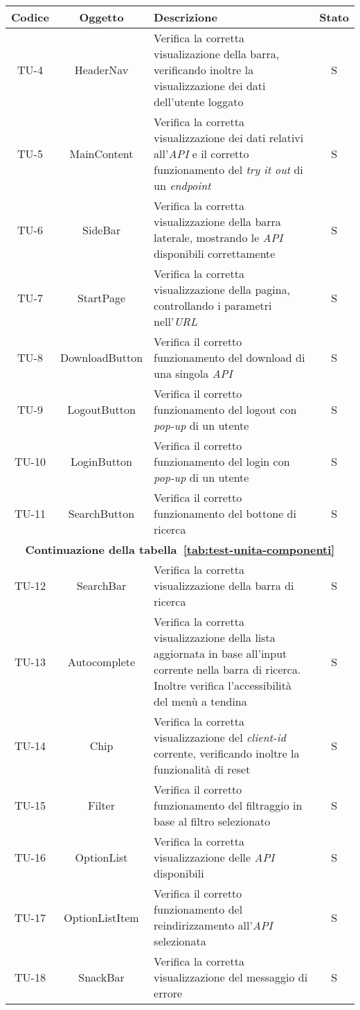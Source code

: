 \begin{center}
  \label{tab:test-unita-componenti}
  \begin{longtable}{|c|c|p{}|c|}
  \hline
  \textbf{Codice} & \textbf{Oggetto} & \textbf{Descrizione} & \textbf{Stato}\\
  \hline
  TU-4 &HeaderNav &Verifica la corretta visualizazione della barra, verificando inoltre la visualizzazione dei dati dell'utente loggato  &S \\
  \hline
  TU-5 &MainContent &Verifica la corretta visualizzazione dei dati relativi all'\textit{API} e il corretto funzionamento del \textit{try it out} di un \textit{endpoint} &S \\
  \hline
  TU-6 &SideBar &Verifica la corretta visualizzazione della barra laterale, mostrando le \textit{API} disponibili correttamente &S \\
  \hline
  TU-7 &StartPage &Verifica la corretta visualizzazione della pagina, controllando i parametri nell'\textit{URL} &S \\
  \hline
  TU-8 &DownloadButton &Verifica il corretto funzionamento del download di una singola \textit{API} &S \\
  \hline
  TU-9 &LogoutButton &Verifica il corretto funzionamento del logout con \textit{pop-up} di un utente &S \\
  \hline
  TU-10 &LoginButton &Verifica il corretto funzionamento del login con \textit{pop-up} di un utente &S \\
  \hline
  TU-11 &SearchButton &Verifica il corretto funzionamento del bottone di ricerca &S \\
  \hline
  \multicolumn{4}{|c|}{\textbf{Continuazione della tabella~\ref{tab:test-unita-componenti}}} \\
  \hline
  TU-12 &SearchBar &Verifica la corretta visualizzazione della barra di ricerca &S \\
  \hline
  TU-13 &Autocomplete &Verifica la corretta visualizzazione della lista aggiornata in base all'input corrente nella barra di ricerca. Inoltre verifica l'accessibilità del menù a tendina  &S \\
  \hline
  TU-14 &Chip &Verifica la corretta visualizzazione del \textit{client-id} corrente, verificando inoltre la funzionalità di reset &S \\
  \hline
  TU-15 &Filter &Verifica il corretto funzionamento del filtraggio in base al filtro selezionato &S \\
  \hline
  TU-16 &OptionList &Verifica la corretta visualizzazione delle \textit{API} disponibili &S \\
  \hline
  TU-17 &OptionListItem &Verifica il corretto funzionamento del reindirizzamento all'\textit{API} selezionata &S \\
  \hline
  TU-18 &SnackBar &Verifica la corretta visualizzazione del messaggio di errore &S \\
  \hline
\end{longtable}
\end{center}

